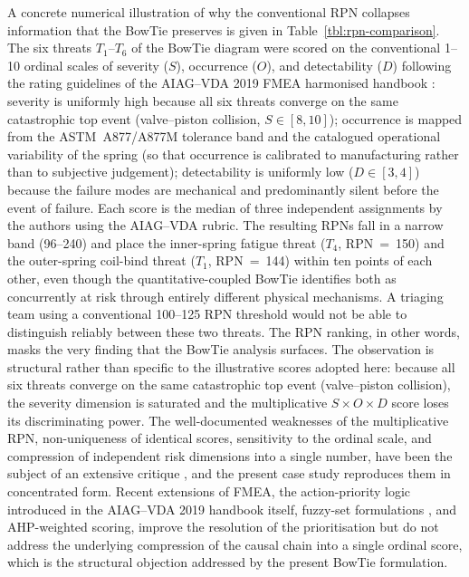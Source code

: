 A concrete numerical illustration of why the conventional RPN
collapses information that the BowTie preserves is given in
Table~\ref{tbl:rpn-comparison}. The six threats $T_{1}$--$T_{6}$ of
the BowTie diagram were scored on the conventional 1--10 ordinal
scales of severity ($S$), occurrence ($O$), and detectability ($D$)
following the rating guidelines of the AIAG--VDA 2019 FMEA harmonised
handbook \citep{aiagvda2019fmea}: severity is uniformly high
because all six threats converge on the same catastrophic top event
(valve--piston collision, $S\in[8,10]$); occurrence is mapped from
the ASTM~A877/A877M tolerance band and the catalogued operational
variability of the spring (so that occurrence is calibrated to
manufacturing rather than to subjective judgement); detectability is
uniformly low ($D\in[3,4]$) because the failure modes are mechanical
and predominantly silent before the event of failure. Each score is
the median of three independent assignments by the authors using the
AIAG--VDA rubric. The resulting RPNs fall in a narrow band
(96--240) and place the inner-spring fatigue threat ($T_{4}$,
RPN~=~150) and the outer-spring coil-bind threat ($T_{1}$,
RPN~=~144) within ten points of each other, even though the
quantitative-coupled BowTie identifies both as concurrently at risk
through entirely different physical mechanisms. A triaging team
using a conventional 100--125 RPN threshold would not be able to
distinguish reliably between these two threats. The RPN ranking, in
other words, masks the very finding that the BowTie analysis
surfaces. The observation is structural rather than specific to the
illustrative scores adopted here: because all six threats converge
on the same catastrophic top event (valve--piston collision), the
severity dimension is saturated and the multiplicative
$S\times O\times D$ score loses its discriminating power. The
well-documented weaknesses of the multiplicative RPN, non-uniqueness of identical scores, sensitivity to the ordinal scale,
and compression of independent risk dimensions into a single
number, have been the subject of an extensive critique
\citep{pillay2003modifiedfmea,liu2013fuzzyfmea,mahmoudvand2025probability},
and the present case study reproduces them in concentrated form. Recent
extensions of FMEA, the action-priority logic introduced in the
AIAG--VDA 2019 handbook itself, fuzzy-set formulations
\citep{liu2013fuzzyfmea,wang2009fuzzyAHP}, and AHP-weighted
scoring, improve the resolution of the prioritisation but do not
address the underlying compression of the causal chain into a
single ordinal score, which is the structural objection addressed by
the present BowTie formulation.

